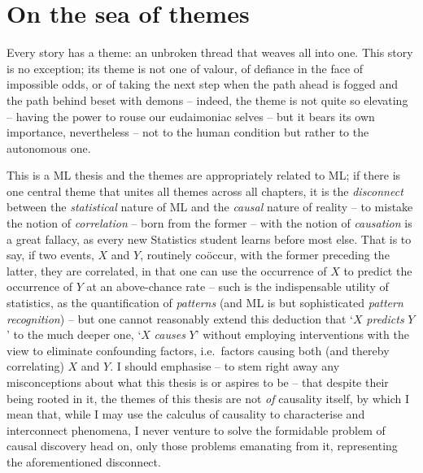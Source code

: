 \section*{On the sea of themes}\label{sec:themes}
Every story has a theme: an unbroken thread that weaves all into one.
%
This story is no exception; its theme is not one of valour, of defiance in the face of impossible
odds, or of taking the next step when the path ahead is fogged and the path behind beset with
demons -- indeed, the theme is not quite so elevating -- having the power to rouse our eudaimoniac
selves -- but it bears its own importance, nevertheless -- not to the human condition but rather to
the autonomous one.

%
%
This is a \ac{ML} thesis and the themes are appropriately related to \ac{ML}; if there is
one central theme that unites all themes across all chapters, it is the \emph{disconnect} between
the \emph{statistical} nature of \ac{ML} and the \emph{causal} nature of reality -- to mistake the
notion of \emph{correlation} -- born from the former -- with the notion of \emph{causation} is a
great fallacy, as every new Statistics student learns before most else.
%
That is to say, if two events, \(X\) and \(Y\), routinely co{\"o}ccur, with the former preceding
the latter, they are correlated, in that one can use the occurrence of \(X\) to predict the
occurrence of \(Y\) at an above-chance rate -- such is the indispensable utility of statistics, as
the quantification of \emph{patterns} (and \ac{ML} is but sophisticated \emph{pattern recognition})
-- but one cannot reasonably extend this deduction that `\(X\) \emph{predicts} \(Y\)' to the much
deeper one, `\(X\) \emph{causes} \(Y\)' without employing interventions with the view to eliminate
confounding factors, i.e.\ factors causing both (and thereby correlating) \(X\) and \(Y\).
%
I should emphasise -- to stem right away any misconceptions about what this thesis is or aspires to
be -- that despite their being rooted in it, the themes of this thesis are not \emph{of} causality
itself, by which I mean that, while I may use the calculus of causality to characterise and
interconnect phenomena, I never venture to solve the formidable problem of causal discovery head
on, only those problems emanating from it, representing the aforementioned disconnect.
%

